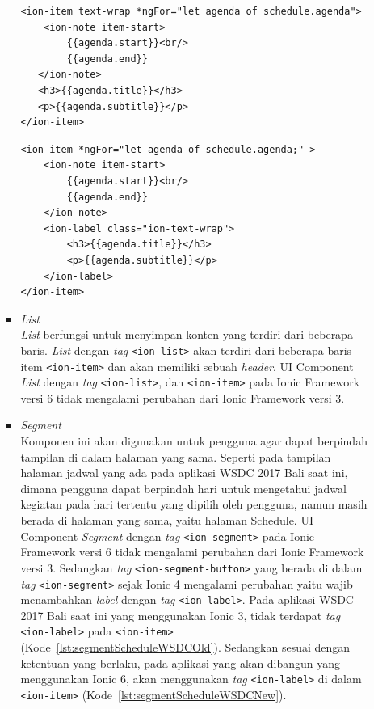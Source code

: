 \begin{enumerate}
\begin{enumerate}
\begin{itemize}
\begin{lstlisting}[label={lst:itemScheduleWSDCOld}, caption=\textit{Tag} <ion-item> dengan Ionic 3 di Aplikasi WSDC 2017 Bali Saat Ini]
<ion-item text-wrap *ngFor="let agenda of schedule.agenda">
	<ion-note item-start>
		{{agenda.start}}<br/>
        {{agenda.end}}
   </ion-note>
   <h3>{{agenda.title}}</h3>
   <p>{{agenda.subtitle}}</p>
</ion-item>
\end{lstlisting}

\begin{lstlisting}[label={lst:itemScheduleWSDCNew}, caption=\textit{Tag} <ion-item> dengan Ionic 6 di Aplikasi WSDC 2017 Bali yang Akan dibuat]
<ion-item *ngFor="let agenda of schedule.agenda;" >
	<ion-note item-start>
    	{{agenda.start}}<br/> 
        {{agenda.end}}
   	</ion-note>
    <ion-label class="ion-text-wrap">
    	<h3>{{agenda.title}}</h3>
        <p>{{agenda.subtitle}}</p>
    </ion-label>
</ion-item>
\end{lstlisting}
			
			\item \textit{List} \\
			\textit{List} berfungsi untuk menyimpan konten yang terdiri dari beberapa baris. \textit{List} dengan \textit{tag} \texttt{<ion-list>} akan terdiri dari beberapa baris item \texttt{<ion-item>} dan akan memiliki sebuah \textit{header}. UI Component \textit{List} dengan \textit{tag} \texttt{<ion-list>}, dan \texttt{<ion-item>} pada Ionic Framework versi 6 tidak mengalami perubahan dari Ionic Framework versi 3.	
		
			\item \textit{Segment} \\
		Komponen ini akan digunakan untuk pengguna agar dapat berpindah tampilan di dalam halaman yang sama. Seperti pada tampilan halaman jadwal yang ada pada aplikasi WSDC 2017 Bali saat ini, dimana pengguna dapat berpindah hari untuk mengetahui jadwal kegiatan pada hari tertentu yang dipilih oleh pengguna, namun masih berada di halaman yang sama, yaitu halaman Schedule. UI Component \textit{Segment} dengan \textit{tag} \texttt{<ion-segment>} pada Ionic Framework versi 6 tidak mengalami perubahan dari Ionic Framework versi 3.
		Sedangkan \textit{tag} \texttt{<ion-segment-button>} yang berada di dalam \textit{tag} \texttt{<ion-segment>} sejak Ionic 4 mengalami perubahan yaitu wajib menambahkan \textit{label} dengan \textit{tag} \texttt{<ion-label>}. Pada aplikasi WSDC 2017 Bali saat ini yang menggunakan Ionic 3, tidak terdapat \textit{tag} \texttt{<ion-label>} pada \texttt{<ion-item>} (Kode~\ref{lst:segmentScheduleWSDCOld}). Sedangkan sesuai dengan ketentuan yang berlaku, pada aplikasi yang akan dibangun yang menggunakan Ionic 6, akan menggunakan \textit{tag} \texttt{<ion-label>} di dalam \texttt{<ion-item>} (Kode~\ref{lst:segmentScheduleWSDCNew}).
		

\end{itemize}
\end{enumerate}
\end{enumerate}
